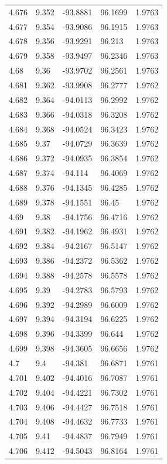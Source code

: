 \begin{tabular}{lllll}
4.676 & 9.352 & -93.8881 & 96.1699 & 1.9763 \\
4.677 & 9.354 & -93.9086 & 96.1915 & 1.9763 \\
4.678 & 9.356 & -93.9291 & 96.213 & 1.9763 \\
4.679 & 9.358 & -93.9497 & 96.2346 & 1.9763 \\
4.68 & 9.36 & -93.9702 & 96.2561 & 1.9763 \\
4.681 & 9.362 & -93.9908 & 96.2777 & 1.9762 \\
4.682 & 9.364 & -94.0113 & 96.2992 & 1.9762 \\
4.683 & 9.366 & -94.0318 & 96.3208 & 1.9762 \\
4.684 & 9.368 & -94.0524 & 96.3423 & 1.9762 \\
4.685 & 9.37 & -94.0729 & 96.3639 & 1.9762 \\
4.686 & 9.372 & -94.0935 & 96.3854 & 1.9762 \\
4.687 & 9.374 & -94.114 & 96.4069 & 1.9762 \\
4.688 & 9.376 & -94.1345 & 96.4285 & 1.9762 \\
4.689 & 9.378 & -94.1551 & 96.45 & 1.9762 \\
4.69 & 9.38 & -94.1756 & 96.4716 & 1.9762 \\
4.691 & 9.382 & -94.1962 & 96.4931 & 1.9762 \\
4.692 & 9.384 & -94.2167 & 96.5147 & 1.9762 \\
4.693 & 9.386 & -94.2372 & 96.5362 & 1.9762 \\
4.694 & 9.388 & -94.2578 & 96.5578 & 1.9762 \\
4.695 & 9.39 & -94.2783 & 96.5793 & 1.9762 \\
4.696 & 9.392 & -94.2989 & 96.6009 & 1.9762 \\
4.697 & 9.394 & -94.3194 & 96.6225 & 1.9762 \\
4.698 & 9.396 & -94.3399 & 96.644 & 1.9762 \\
4.699 & 9.398 & -94.3605 & 96.6656 & 1.9762 \\
4.7 & 9.4 & -94.381 & 96.6871 & 1.9761 \\
4.701 & 9.402 & -94.4016 & 96.7087 & 1.9761 \\
4.702 & 9.404 & -94.4221 & 96.7302 & 1.9761 \\
4.703 & 9.406 & -94.4427 & 96.7518 & 1.9761 \\
4.704 & 9.408 & -94.4632 & 96.7733 & 1.9761 \\
4.705 & 9.41 & -94.4837 & 96.7949 & 1.9761 \\
4.706 & 9.412 & -94.5043 & 96.8164 & 1.9761 \\

\end{tabular}
